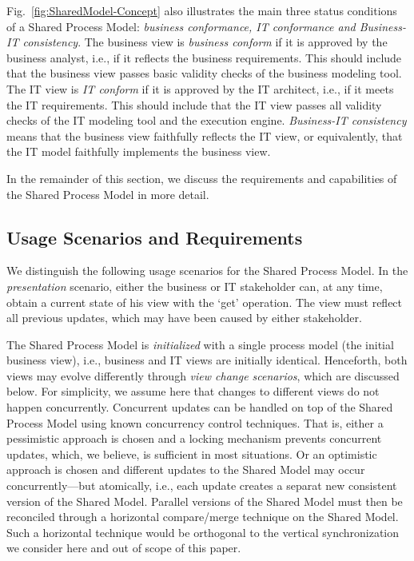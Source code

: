 Fig.~\ref{fig:SharedModel-Concept} also illustrates the main three status conditions of a Shared Process Model: \emph{business conformance, IT conformance and Business-IT consistency}. The business view is \emph{business conform} if it is approved by the business analyst, i.e., if it reflects the business requirements. This should include that the business view passes basic validity checks of the business modeling tool. The IT view is \emph{IT conform} if it is approved by the IT architect, i.e., if it meets the IT requirements. This should include that the IT view passes all validity checks of the IT modeling tool and the execution engine. \emph{Business-IT consistency} means that the business view faithfully reflects the IT view, or equivalently, that the IT model faithfully implements the business view. 

In the remainder of this section, we discuss the requirements and capabilities of the Shared Process Model in more detail.



\subsection{Usage Scenarios and Requirements}
\label{sec:requirements2}

We distinguish the following usage scenarios for the Shared Process Model. In the \emph{presentation} scenario, either the business or IT stakeholder can, at any time, obtain a current state of his view with the `get' operation. The view must reflect all previous updates, which may have been caused by either stakeholder.

The Shared Process Model is \emph{initialized} with a single process model (the initial business view), i.e., business and IT views are initially identical. Henceforth, both views may evolve differently through \emph{view change scenarios}, which are discussed below.
For simplicity, we assume here that changes to different views do not happen concurrently. Concurrent updates can be handled on top of the Shared Process Model using known concurrency control techniques. That is, either a pessimistic approach is chosen and a locking mechanism prevents concurrent updates, which, we believe, is sufficient in most situations. Or an optimistic approach is chosen and different updates to the Shared Model may occur concurrently---but atomically, i.e., each update creates a separat new consistent version of the Shared Model. Parallel versions of the Shared Model must then be reconciled through a horizontal compare/merge technique on the Shared Model. Such a horizontal technique would be orthogonal to the vertical synchronization we consider here and out of scope of this paper.


